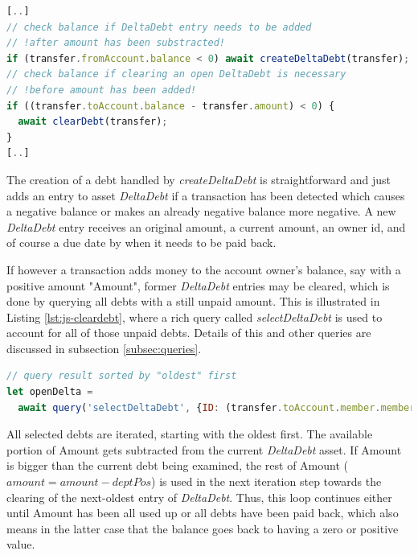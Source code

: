 \begin{center}
\begin{minipage}{0.8\textwidth}
\small
\begin{lstlisting}[language=javascript,firstnumber=1,caption={\bf\small moveMoney JavaScript excerpt}, captionpos=b,label=lst:js-movemoney]
[..]
// check balance if DeltaDebt entry needs to be added
// !after amount has been substracted!
if (transfer.fromAccount.balance < 0) await createDeltaDebt(transfer);
// check balance if clearing an open DeltaDebt is necessary
// !before amount has been added!
if ((transfer.toAccount.balance - transfer.amount) < 0) {
  await clearDebt(transfer);
}
[..]
\end{lstlisting}
\end{minipage}
\end{center}

The creation of a debt handled by \textit{createDeltaDebt} is straightforward and just adds an entry to asset \textit{DeltaDebt} if a transaction has been detected which causes a negative balance or makes an already negative balance more negative. A new \textit{DeltaDebt} entry receives an original amount, a current amount, an owner id, and of course a due date by when it needs to be paid back.

If however a transaction adds money to the account owner's balance, say with a positive amount "Amount", former \textit{DeltaDebt} entries may be cleared, which is done by querying all debts with a still unpaid amount. This is illustrated in Listing \ref{lst:js-cleardebt}, where a rich query called \textit{selectDeltaDebt} is used to account for all of those unpaid debts. Details of this and other queries are discussed in subsection \ref{subsec:queries}.

\begin{center}
\begin{minipage}{0.8\textwidth}
\small
\begin{lstlisting}[language=javascript,firstnumber=1,caption={\bf\small clearDebt JavaScript excerpt}, captionpos=b,label=lst:js-cleardebt]
// query result sorted by "oldest" first
let openDelta =
  await query('selectDeltaDebt', {ID: (transfer.toAccount.member.memberID)});
\end{lstlisting}
\end{minipage}
\end{center}

All selected debts are iterated, starting with the oldest first. The available portion of Amount gets subtracted from the current \textit{DeltaDebt} asset. If Amount is bigger than the current debt being examined, the rest of Amount ($amount = amount - deptPos$) is used in the next iteration step towards the clearing of the next-oldest entry of \textit{DeltaDebt}. Thus, this loop continues either until Amount has been all used up or all debts have been paid back, which also means in the latter case that the balance goes back to having a zero or positive value.

